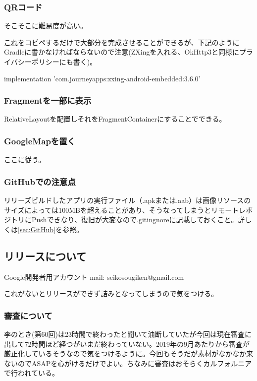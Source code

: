\documentclass[dvipdfmx,jb5]{jreport}
\newcommand{\link}[2]{\href{#2}{#1}}
\begin{document}
\subsubsection{QRコード}
そこそこに難易度が高い。\par
\link{これ}{https://github.com/SeikoStudentCouncil/SeikoFestaAndroidApp62nd/blob/master/app/src/main/java/jp/ac/seiko/itec/seikofestaapp62nd/fragments/treasurehunt/QRCodeFragment.kt}をコピペするだけで大部分を完成させることができるが、下記のようにGradleに書かなければならないので注意(ZXingを入れる、OkHttp3と同様にプライバシーポリシーにも書く)。\par
implementation 'com.journeyapps:zxing-android-embedded:3.6.0'
\subsubsection{Fragmentを一部に表示}
RelativeLayoutを配置しそれをFragmentContainerにすることでできる。
\subsubsection{GoogleMapを置く}
\link{ここ}{https://developers.google.com/maps/documentation/android-sdk/start?hl=ja}に従う。
\subsubsection{GitHubでの注意点}
リリーズビルドしたアプリの実行ファイル（.apkまたは.aab）は画像リソースのサイズによっては100MBを超えることがあり、そうなってしまうとリモートレポジトリにPushできなり、復旧が大変なので.gitingnoreに記載しておくこと。詳しくは\ref{sec:GitHub}を参照。
\subsection{リリースについて}
\begin{itembox}[l]{Google開発者用アカウント}
      \color{red}
      mail: seikosougiken@gmail.com\\
\end{itembox}
これがないとリリースができず詰みとなってしまうので気をつける。
\subsubsection{審査について}
李のとき(第60回)は23時間で終わったと聞いて油断していたが今回は現在審査に出して72時間ほど経つがいまだ終わっていない。2019年の9月あたりから審査が厳正化しているそうなので気をつけるように。今回もそうだが素材がなかなか来ないのでASAPを心がけるだけでよい。ちなみに審査はおそらくカルフォルニアで行われている。
\end{document}
